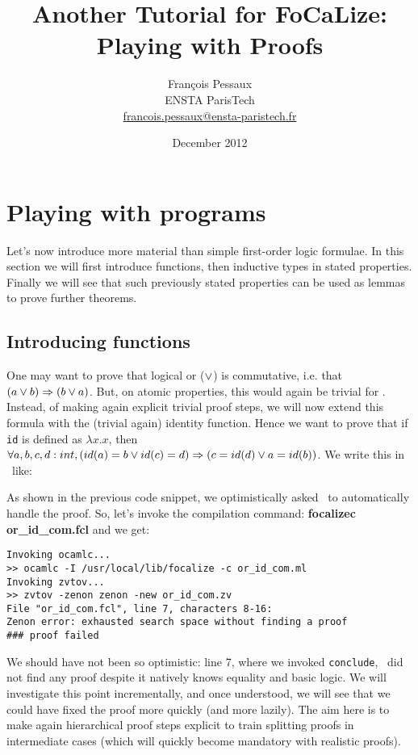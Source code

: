 \documentclass[11pt,a4paper,twoside,onecolumn,fullpage]{article}
\author{Fran\c{c}ois Pessaux\\
  ENSTA ParisTech\\
  \url{francois.pessaux@ensta-paristech.fr}}
\title{Another Tutorial for {F}o{C}a{L}ize:\\
  Playing with Proofs}
\date{December 2012}
\begin{document}
\maketitle




\section{Playing with programs}
Let's now introduce more material than simple first-order logic
formulae. In this section we will first introduce functions, then
inductive types in stated properties. Finally we will see that
such previously stated properties can be used as lemmas to prove further
theorems.

\subsection{Introducing functions}
One may want to prove that logical or ($\vee$) is commutative,
i.e. that $(a \vee b) \Rightarrow (b \vee a)$. But, on atomic
properties, this would again be trivial for \zenon. Instead, of making
again explicit trivial proof steps, we will now extend this formula
with the (trivial again) identity function. Hence we want to prove
that if \verb"id" is defined as $\lambda x.x$, then
$\forall a, b, c, d : int, (id (a) = b \vee id (c) = d) \Rightarrow (c = id (d) \vee a = id (b))$.
We write this in \focal\ like:

{\scriptsize
}

As shown in the previous code snippet, we optimistically asked \zenon\ to
automatically handle the proof. So, let's invoke the compilation
command: \textbf{focalizec or\_id\_com.fcl} and we get:

{\scriptsize
\begin{verbatim}
Invoking ocamlc...
>> ocamlc -I /usr/local/lib/focalize -c or_id_com.ml
Invoking zvtov...
>> zvtov -zenon zenon -new or_id_com.zv
File "or_id_com.fcl", line 7, characters 8-16:
Zenon error: exhausted search space without finding a proof
### proof failed
\end{verbatim}}

We should have not been so optimistic: line 7, where we invoked \lstinline"conclude",
\zenon\ did not find any proof despite it natively knows equality and
basic logic. We will investigate this point incrementally, and once
understood, we will see that we could have fixed the proof more
quickly (and more lazily). The aim here is to make again hierarchical
proof steps explicit to train splitting proofs in intermediate cases
(which will quickly become mandatory with realistic proofs).
\end{document}
